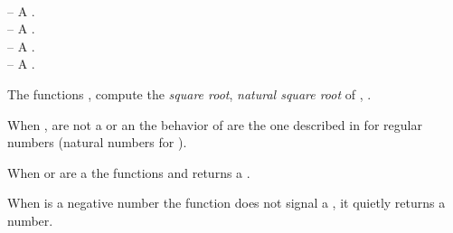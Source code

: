 \documentclass[../Comparisons-Predicates.tex]{subfiles}
\begin{document}

\DSyntax{}

  \RArrow{} \\
  \RArrow{} 

\DArgsNValues{}

 -- A .\\
 -- A .\\
 -- A .\\
 -- A .

\DDescription{}

The functions ,  compute the \emph{square root},
\emph{natural square root} of , .

\noindent
When ,   are not a  or an
 the behavior of   are the one
described in \cite{1996:ANSIHyperSpec} for regular numbers (natural
numbers for ).

\noindent
When  or  are a  the functions
 and  returns a .

\noindent
When  is a negative 
number the function  does not signal a
, it quietly returns a
 number.
\end{document}
